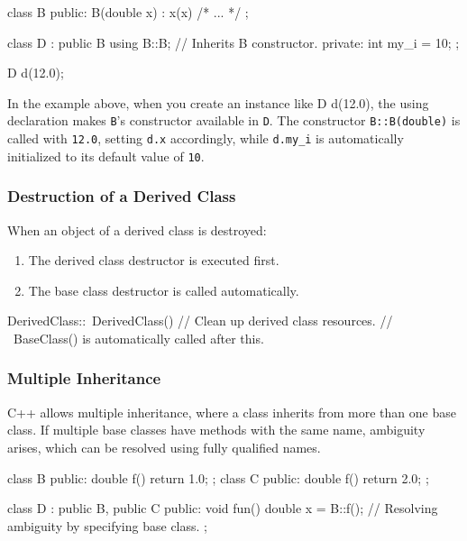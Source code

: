 \begin{codeblock}[language=C++]
class B {
public:
    B(double x) : x(x) { /* ... */ }
};

class D : public B {
    using B::B; // Inherits B constructor.
private:
    int my_i = 10;
};

D d(12.0);
\end{codeblock}

In the example above, when you create an instance like D d(12.0), the using declaration makes \texttt{B}'s constructor available in \texttt{D}. The constructor \texttt{B::B(double)} is called with \texttt{12.0}, setting \texttt{d.x} accordingly, while \texttt{d.my\_i} is automatically initialized to its default value of \texttt{10}.

\subsubsection{Destruction of a Derived Class}

When an object of a derived class is destroyed:

\begin{enumerate}
    \item The derived class destructor is executed first.
    \item The base class destructor is called automatically.
\end{enumerate}

\begin{codeblock}[language=C++, numbers=none]
DerivedClass::~DerivedClass() {
    // Clean up derived class resources.
    // ~BaseClass() is automatically called after this.
}
\end{codeblock}

\subsubsection{Multiple Inheritance}

C++ allows multiple inheritance, where a class inherits from more than one base class. If multiple base classes have methods with the same name, ambiguity arises, which can be resolved using fully qualified names.

\begin{codeblock}[language=C++, numbers=none]
class B { public: double f() { return 1.0; } };
class C { public: double f() { return 2.0; } };

class D : public B, public C {
public:
    void fun() {
        double x = B::f(); // Resolving ambiguity by specifying base class.
    }
};
\end{codeblock}

